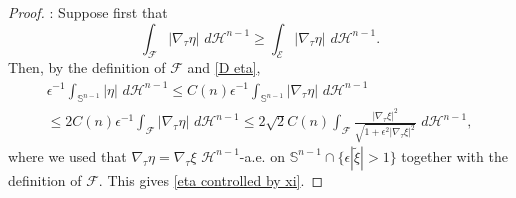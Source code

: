 \documentclass[reqno,11pt]{amsart}
\def\ez{\epsilon}
\numberwithin{equation}{section}
\theoremstyle{remark}
\begin{document}
\begin{proof}
\medskip
{}:
Suppose first that
\begin{equation}\label{F large}
\int_{\mathcal F}  |\nabla_\tau \eta| \, \,d\mathscr H^{n-1}\ge \int_{\mathcal E}  |\nabla_\tau \eta| \, \,d\mathscr H^{n-1}.
\end{equation}
Then, by the definition of $\mathcal F$ and \eqref{D eta},
\begin{multline}\label{control 1}
\ez^{-1}\int_{\mathbb S^{n-1}} |\eta|  \, \,d\mathscr H^{n-1}  \leq  C(n) \ez^{-1} \int_{\mathbb S^{n-1} }  |\nabla_\tau \eta| \, \,d\mathscr H^{n-1}\\
\leq  2C(n) \ez^{-1} \int_{\mathcal F}  |\nabla_\tau \eta| \, \,d\mathscr H^{n-1}\le 2\sqrt{2} C(n)  \int_{\mathcal F} \frac{|\nabla_\tau  \xi|^2}{\sqrt{1+\ez^2|\nabla_\tau \xi|^2}} \, \,d\mathscr H^{n-1},
    \end{multline}
where we used that $\nabla_\tau\eta=\nabla_\tau  \xi$ $\mathscr H^{n-1}$-a.e. on $\mathbb S^{n-1}\cap \{\ez|\tilde\xi|>  1\}$ together with the definition of $\mathcal F$.
This gives \eqref{eta controlled by xi}.


\end{proof}
\end{document}
